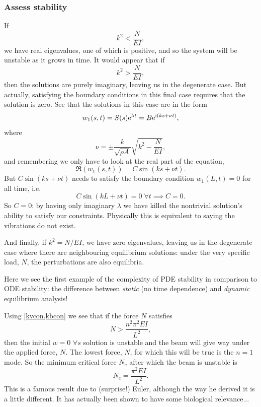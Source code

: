 \documentclass[main.tex]{subfiles}
\begin{document}
\subsubsection*{\StepFour Assess stability}
If
\begin{equation}
\label{kvcon}
k^2 < \frac{N}{EI},
\end{equation} 
we have real eigenvalues, one of which is positive, and so the system will be unstable as it grows in time. It would appear that if
\begin{equation}
	k^2 > \frac{N}{EI},
\end{equation}
then the solutions are purely imaginary, leaving us in the degenerate case. But actually, satisfying the boundary conditions in this final case requires that the solution is zero. See that the solutions in this case are in the form 
\begin{equation}
w_1(s,t) = S(s)\mathrm{e}^{\lambda t} = B\mathrm{e}^{\mathrm{i}(k s  + \nu t)},
\end{equation}
where
\begin{equation}
	\nu = \pm\frac{k}{\sqrt{\rho A}}\sqrt{k^2-\frac{N}{EI}},
\end{equation} 
and remembering we only have to look at the real part of the equation,
\begin{equation}
	\Re(w_1(s,t)) = C\sin(k s  + \nu t).
\end{equation}
But $C\sin(k s+\nu t)$ needs to satisfy the boundary condition $w_1(L,t)=0$ for all time, i.e.\
\begin{equation}
	C\sin(kL + \nu t) = 0 \; \forall t \implies C = 0.
\end{equation}
So $C=0$: by having only imaginary $\lambda$ we have killed the nontrivial solution's ability to satisfy our constraints. Physically this is equivalent to saying the vibrations do not exist.

And finally, if $k^2=N/EI$, we have zero eigenvalues, leaving us in the degenerate case where there are neighbouring equilibrium solutions: under the very specific load, $N$, the perturbations are also equilibria.

Here we see the first example of the complexity of PDE stability in comparison to ODE stability: the difference between \emph{static} (no time dependence) and \emph{dynamic} equilibrium analysis!
 
Using \cref{kvcon,kbcon} we see that if the force $N$ satisfies
\begin{equation}
\label{eulerbuck}
N > \frac{n^2 \pi^2 E I}{L^2},
\end{equation}
then the  initial $w=0$ $\forall s$ solution is unstable and the beam will give way under the applied force, $N$. The lowest force, $N$, for which this will be true is the $n=1$ mode. So the minimum critical force $N_c$ after which the beam is unstable is 
\begin{equation}
\label{criticalforce}
N_c=\frac{\pi^2 E I}{L^2}.
\end{equation}
This is a famous result due to (surprise!) Euler, although the way he derived it is a little different. It has actually been shown to have some biological relevance...
\end{document}
